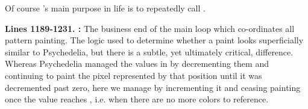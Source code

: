 Of course 's main purpose in life is to repeatedly call .

\bigskip
\bigskip
\bigskip
\bigskip
\bigskip

\textbf{Lines 1189-1231. :} The business end of the main loop which co-ordinates
all pattern painting. The logic used to determine whether a paint looks superficially similar to Psychedelia, but there is
a subtle, yet ultimately critical, difference. Whereas Psychedelia managed the values 
in by decrementing them and continuing to paint the pixel represented by that
position until it was decremented past zero, here we manage  by incrementing
it and ceasing painting once the value reaches , i.e. when there are no more colors to reference.


